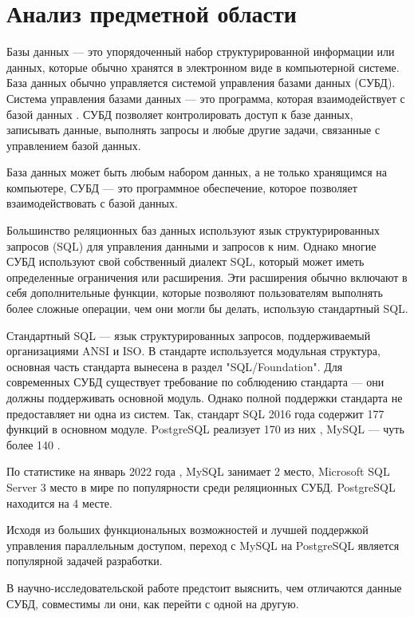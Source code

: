 \chapter{Анализ предметной области}
\label{cha:body}
Базы данных --- это упорядоченный набор структурированной информации или данных, которые обычно хранятся в электронном виде в компьютерной системе. 
База данных обычно управляется системой управления базами данных (СУБД). 
Система управления базами данных --- это программа, которая взаимодействует с базой данных \cite{oracle-db}. 
СУБД позволяет контролировать доступ к базе данных, записывать данные, выполнять запросы и любые другие задачи, связанные с управлением базой данных. 

База данных может быть любым набором данных, а не только хранящимся на компьютере, СУБД --- это программное обеспечение, которое позволяет взаимодействовать с базой данных.

Большинство реляционных баз данных используют язык структурированных запросов (SQL) для управления данными и запросов к ним.
Однако многие СУБД используют свой собственный диалект SQL, который может иметь определенные ограничения или расширения. 
Эти расширения обычно включают в себя дополнительные функции, которые позволяют пользователям выполнять более сложные операции, 
чем они могли бы делать, использую стандартный SQL. 

Стандартный SQL --- язык структурированных запросов, поддерживаемый организациями ANSI\cite{ansi-sql} и ISO\cite{iso-sql}. 
В стандарте используется модульная структура, основная часть стандарта вынесена в раздел "SQL/Foundation".  
Для современных СУБД существует требование по соблюдению стандарта --- они должны поддерживать основной модуль. 
Однако полной поддержки стандарта не предоставляет ни одна из систем.  
Так, стандарт SQL 2016 года содержит 177 функций в основном модуле. PostgreSQL реализует 170 из них \cite{postgresql-standard},
MySQL --- чуть более 140 \cite{mysql-standard}.  

По статистике на январь 2022 года \cite{sql-rating}, MySQL занимает 2 место, Microsoft SQL Server 3 место в мире по популярности 
среди реляционных СУБД. PostgreSQL находится на 4 месте. 


Исходя из больших функциональных возможностей и лучшей поддержкой управления параллельным доступом, 
переход с MySQL на PostgreSQL является популярной задачей разработки. 

В научно-исследовательской работе предстоит выяснить, чем отличаются данные СУБД, совместимы ли они, 
как перейти с одной на другую.  

